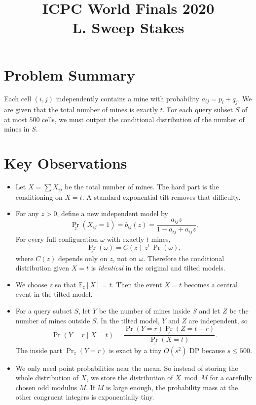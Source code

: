 \documentclass[11pt]{article}
\title{ICPC World Finals 2020\\L. Sweep Stakes}
\author{}
\date{}
\begin{document}
\maketitle

\section*{Problem Summary}

Each cell $(i,j)$ independently contains a mine with probability $a_{ij}=p_i+q_j$.
We are given that the total number of mines is exactly $t$.
For each query subset $S$ of at most $500$ cells, we must output the conditional distribution of the number of mines in
$S$.

\section*{Key Observations}

\begin{itemize}[leftmargin=*]
    \item Let $X=\sum X_{ij}$ be the total number of mines.
    The hard part is the conditioning on $X=t$.
    A standard exponential tilt removes that difficulty.
    \item For any $z>0$, define a new independent model by
    \[
        \Pr_z(X_{ij}=1)=b_{ij}(z)=\frac{a_{ij}z}{1-a_{ij}+a_{ij}z}.
    \]
    For every full configuration $\omega$ with exactly $t$ mines,
    \[
        \Pr_z(\omega)=C(z)\,z^t\,\Pr(\omega),
    \]
    where $C(z)$ depends only on $z$, not on $\omega$.
    Therefore the conditional distribution given $X=t$ is \emph{identical} in the original and tilted models.
    \item We choose $z$ so that $\mathbb E_z[X]=t$.
    Then the event $X=t$ becomes a central event in the tilted model.
    \item For a query subset $S$, let $Y$ be the number of mines inside $S$ and let $Z$ be the number of mines outside
    $S$.
    In the tilted model, $Y$ and $Z$ are independent, so
    \[
        \Pr(Y=r\mid X=t)=\frac{\Pr_z(Y=r)\Pr_z(Z=t-r)}{\Pr_z(X=t)}.
    \]
    The inside part $\Pr_z(Y=r)$ is exact by a tiny $O(s^2)$ DP because $s\le 500$.
    \item We only need point probabilities near the mean.
    So instead of storing the whole distribution of $X$, we store the distribution of $X \bmod M$ for a carefully
    chosen odd modulus $M$.
    If $M$ is large enough, the probability mass at the other congruent integers is exponentially tiny.
\end{itemize}
\end{document}
